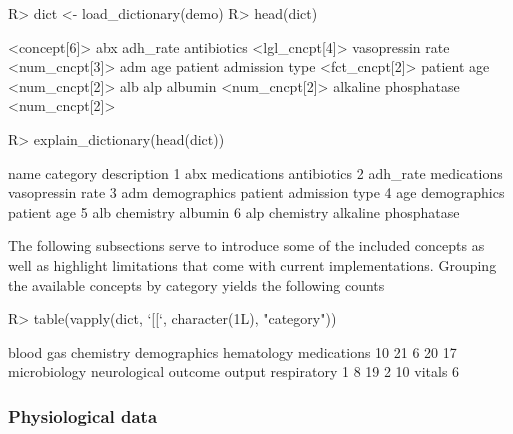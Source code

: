 \documentclass[
  notitle]{jss}
\begin{document}
\begin{CodeChunk}
\begin{CodeInput}
R> dict <- load_dictionary(demo)
R> head(dict)
\end{CodeInput}
\begin{CodeOutput}
<concept[6]>
                                  abx                              adh_rate 
           antibiotics <lgl_cncpt[4]>       vasopressin rate <num_cncpt[3]> 
                                  adm                                   age 
patient admission type <fct_cncpt[2]>            patient age <num_cncpt[2]> 
                                  alb                                   alp 
               albumin <num_cncpt[2]>   alkaline phosphatase <num_cncpt[2]> 
\end{CodeOutput}
\begin{CodeInput}
R> explain_dictionary(head(dict))
\end{CodeInput}
\begin{CodeOutput}
      name     category            description
1      abx  medications            antibiotics
2 adh_rate  medications       vasopressin rate
3      adm demographics patient admission type
4      age demographics            patient age
5      alb    chemistry                albumin
6      alp    chemistry   alkaline phosphatase
\end{CodeOutput}
\end{CodeChunk}

The following subsections serve to introduce some of the included
concepts as well as highlight limitations that come with current
implementations. Grouping the available concepts by category yields the
following counts

\begin{CodeChunk}
\begin{CodeInput}
R> table(vapply(dict, `[[`, character(1L), "category"))
\end{CodeInput}
\begin{CodeOutput}

   blood gas    chemistry demographics   hematology  medications 
          10           21            6           20           17 
microbiology neurological      outcome       output  respiratory 
           1            8           19            2           10 
      vitals 
           6 
\end{CodeOutput}
\end{CodeChunk}

\hypertarget{physiological-data}{%
\subsubsection{Physiological data}\label{physiological-data}}
\end{document}
